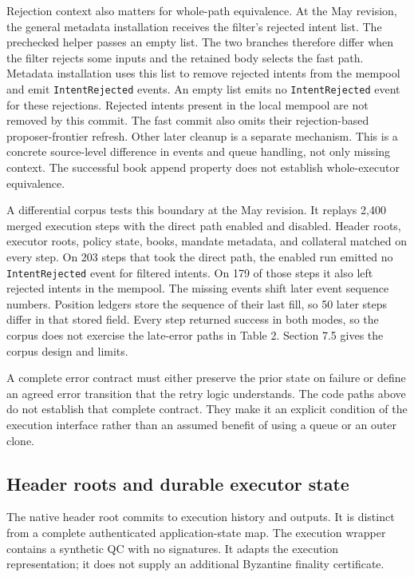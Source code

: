 \documentclass[11pt]{article}
\begin{document}
Rejection context also matters for whole-path equivalence. At the May revision, the general metadata installation receives the filter's rejected intent list. The prechecked helper passes an empty list. The two branches therefore differ when the filter rejects some inputs and the retained body selects the fast path. Metadata installation uses this list to remove rejected intents from the mempool and emit \texttt{IntentRejected} events. An empty list emits no \texttt{IntentRejected} event for these rejections. Rejected intents present in the local mempool are not removed by this commit. The fast commit also omits their rejection-based proposer-frontier refresh. Other later cleanup is a separate mechanism. This is a concrete source-level difference in events and queue handling, not only missing context. The successful book append property does not establish whole-executor equivalence. \cite{R27,R29}

A differential corpus tests this boundary at the May revision. It replays 2,400 merged execution steps with the direct path enabled and disabled. Header roots, executor roots, policy state, books, mandate metadata, and collateral matched on every step. On 203 steps that took the direct path, the enabled run emitted no \texttt{IntentRejected} event for filtered intents. On 179 of those steps it also left rejected intents in the mempool. The missing events shift later event sequence numbers. Position ledgers store the sequence of their last fill, so 50 later steps differ in that stored field. Every step returned success in both modes, so the corpus does not exercise the late-error paths in Table 2. Section 7.5 gives the corpus design and limits. \cite{R30}

A complete error contract must either preserve the prior state on failure or define an agreed error transition that the retry logic understands. The code paths above do not establish that complete contract. They make it an explicit condition of the execution interface rather than an assumed benefit of using a queue or an outer clone.

\subsection{Header roots and durable executor state}
The native header root commits to execution history and outputs. It is distinct from a complete authenticated application-state map. The execution wrapper contains a synthetic QC with no signatures. It adapts the execution representation; it does not supply an additional Byzantine finality certificate. \cite{R12}
\end{document}
